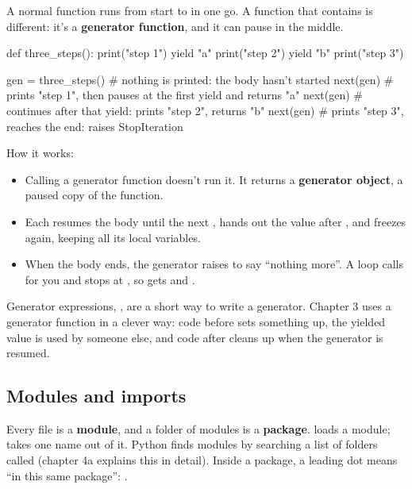 A normal function runs from start to  in one go. A function that contains  is different: it's a \textbf{generator function}, and it can pause in the middle.

\begin{py}
def three_steps():
	print("step 1")
	yield "a"
	print("step 2")
	yield "b"
	print("step 3")


gen = three_steps()   # nothing is printed: the body hasn't started
next(gen)             # prints "step 1", then pauses at the first yield and returns "a"
next(gen)             # continues after that yield: prints "step 2", returns "b"
next(gen)             # prints "step 3", reaches the end: raises StopIteration
\end{py}

How it works:
\begin{itemize}
\item Calling a generator function doesn't run it. It returns a \textbf{generator object}, a paused copy of the function.
\item Each  resumes the body until the next , hands out the value after , and freezes again, keeping all its local variables.
\item When the body ends, the generator raises  to say ``nothing more''. A  loop calls  for you and stops at , so  gets  and .
\end{itemize}

Generator expressions, , are a short way to write a generator. Chapter 3 uses a generator function in a clever way: code before  sets something up, the yielded value is used by someone else, and code after  cleans up when the generator is resumed.

\subsection{Modules and imports}

Every  file is a \textbf{module}, and a folder of modules is a \textbf{package}.  loads a module;  takes one name out of it. Python finds modules by searching a list of folders called  (chapter 4a explains this in detail). Inside a package, a leading dot means ``in this same package'': .

